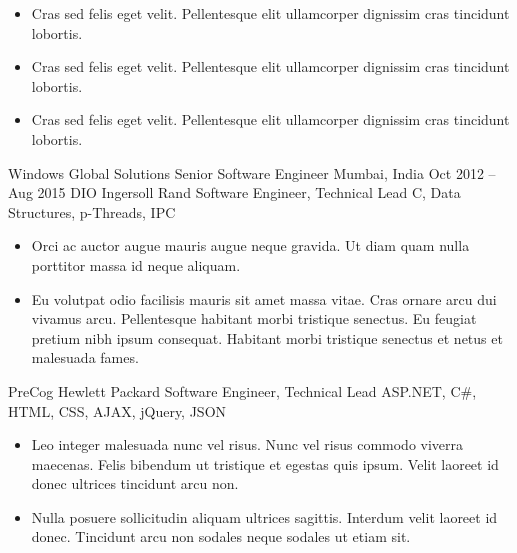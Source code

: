 \documentclass[10pt, a4paper]{cvhari}
\begin{document}
        \begin{itemize}
            \item Cras sed felis eget velit. Pellentesque elit ullamcorper dignissim cras tincidunt lobortis. \smallskip
            \item Cras sed felis eget velit. Pellentesque elit ullamcorper dignissim cras tincidunt lobortis. \smallskip
            \item Cras sed felis eget velit. Pellentesque elit ullamcorper dignissim cras tincidunt lobortis. \smallskip
        \end{itemize}

\smallskip
\divider
\smallskip

    \company
        {Windows Global Solutions}
        {Senior Software Engineer}
        {Mumbai, India}
        {Oct 2012 – Aug 2015}
        \project
        {DIO}
        {Ingersoll Rand}
        {Software Engineer, Technical Lead}
        {C, Data Structures, p-Threads, IPC}
        
        \begin{itemize}
            \item  Orci ac auctor augue mauris augue neque gravida. Ut diam quam nulla porttitor massa id neque aliquam.\smallskip
            \item Eu volutpat odio facilisis mauris sit amet massa vitae. Cras ornare arcu dui vivamus arcu. Pellentesque habitant morbi tristique senectus. Eu feugiat pretium nibh ipsum consequat. Habitant morbi tristique senectus et netus et malesuada fames.\smallskip
        \end{itemize}
        
        \dividergray
        
        \project
            {PreCog}
            {Hewlett Packard}
            {Software Engineer, Technical Lead}
            {ASP.NET, C\#, HTML, CSS, AJAX, jQuery, JSON}
        
        \begin{itemize}
            \item Leo integer malesuada nunc vel risus. Nunc vel risus commodo viverra maecenas. Felis bibendum ut tristique et egestas quis ipsum. Velit laoreet id donec ultrices tincidunt arcu non.\smallskip
            \item Nulla posuere sollicitudin aliquam ultrices sagittis. Interdum velit laoreet id donec. Tincidunt arcu non sodales neque sodales ut etiam sit.\smallskip
        \end{itemize}
        
\end{document}
